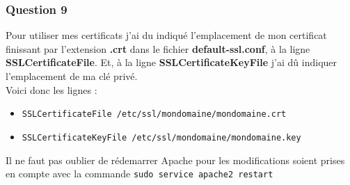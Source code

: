 \documentclass[12pt, a4paper]{article}
\begin{document}
\subsubsection*{Question 9}
Pour utiliser mes certificats j'ai du indiqué l'emplacement de mon certificat finissant par
l'extension \textbf{.crt} dans le fichier \textbf{default-ssl.conf}, à la ligne 
\textbf{SSLCertificateFile}. Et, à la ligne \textbf{SSLCertificateKeyFile} j'ai dû indiquer
l'emplacement de ma clé privé.\\

Voici donc les lignes : 
\begin{itemize}
    \item \texttt{SSLCertificateFile /etc/ssl/mondomaine/mondomaine.crt}
    \item \texttt{SSLCertificateKeyFile /etc/ssl/mondomaine/mondomaine.key}\\
\end{itemize}

Il ne faut pas oublier de rédemarrer Apache pour les modifications soient prises en 
compte avec la commande \texttt{sudo service apache2 restart}
\end{document}
